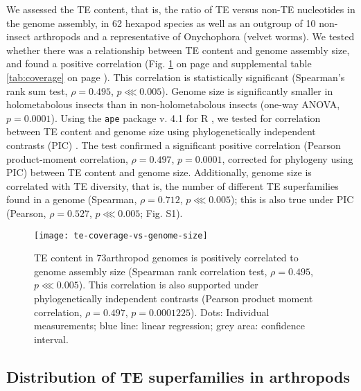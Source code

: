 We assessed the TE content, that is, the ratio of TE versus non-TE
nucleotides in the genome assembly, in 62 hexapod species as well as an
outgroup of 10 non-insect arthropods and a representative of Onychophora
(velvet worms). We tested whether there was a relationship between TE
content and genome assembly size, and found a positive correlation (Fig.
\ref{fig:te-coverage-vs-genome-size} on page
\pageref{fig:te-coverage-vs-genome-size} and supplemental table
\ref{tab:coverage} on page \pageref{tab:coverage}). This correlation is
statistically significant (Spearman's rank sum test, \(\rho = 0.495\),
\(p \lll 0.005\)). Genome size is significantly smaller in
holometabolous insects than in non-holometabolous insects (one-way
ANOVA, \(p = 0.0001\)). Using the \texttt{ape} package v. 4.1
\citep{Paradis2004} for R \citep{RCoreTeam2017}, we tested for
correlation between TE content and genome size using phylogenetically
independent contrasts (PIC) \citep{Felsenstein1985}. The test confirmed
a significant positive correlation (Pearson product-moment correlation,
\(\rho = 0.497\), \(p = 0.0001\), corrected for phylogeny using PIC)
between TE content and genome size. Additionally, genome size is
correlated with TE diversity, that is, the number of different TE
superfamilies found in a genome (Spearman, \(\rho = 0.712\), \(p \lll
0.005\)); this is also true under PIC (Pearson, \(\rho = 0.527\), \(p
\lll 0.005\); Fig. S1).

\begin{figure}[h!]
\begin{center}
\texttt{[image: te-coverage-vs-genome-size]}
\caption{{TE content in 73arthropod genomes is positively correlated to genome
assembly size (Spearman rank correlation test, \(\rho = 0.495\),
\(p \lll 0.005\)). This correlation is also supported under
phylogenetically independent contrasts \protect\citep{Felsenstein1985} (Pearson
product moment correlation, \(\rho = 0.497\), \(p = 0.0001225\)). Dots:
Individual measurements; blue line: linear regression; grey area:
confidence interval.%
}}%
\label{fig:te-coverage-vs-genome-size}%
\end{center}
\end{figure}

\subsection{Distribution of TE superfamilies in
arthropods}\label{distribution-of-te-superfamilies-in-arthropods}

